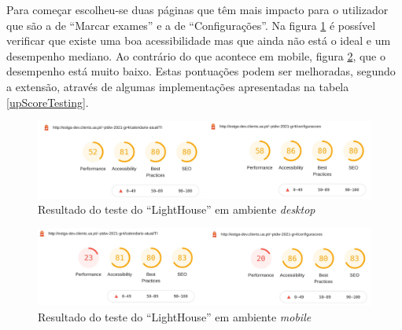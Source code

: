 \documentclass[11pt, twoside]{report}
\begin{document}
	Para começar escolheu-se duas páginas que têm mais impacto para o utilizador que são a de ``Marcar exames'' e a de ``Configurações''.
	Na figura \ref{testDesktop} é possível verificar que existe uma boa acessibilidade mas que ainda não está o ideal e um desempenho mediano.
	Ao contrário do que acontece em mobile, figura \ref{testMobile}, que o desempenho está muito baixo. Estas pontuações podem ser melhoradas, segundo a extensão, através de algumas implementações apresentadas na tabela \ref{upScoreTesting}.
	
	
	 \begin{figure}[H] 
	 	\centering 							\includegraphics[width=1\textwidth,height=1\textheight,keepaspectratio]{image/acessibilityTests/Desktop}
	 	\caption{Resultado do teste do ``LightHouse'' em ambiente \textit{desktop}}
	 	\label{testDesktop}
	 \end{figure}
 
	
	\begin{figure}[H] 
		\centering 							\includegraphics[width=1\textwidth,height=1\textheight,keepaspectratio]{image/acessibilityTests/mobile}
		\caption{Resultado do teste do ``LightHouse'' em ambiente \textit{mobile}}
		\label{testMobile}
	\end{figure}
	
\end{document}
